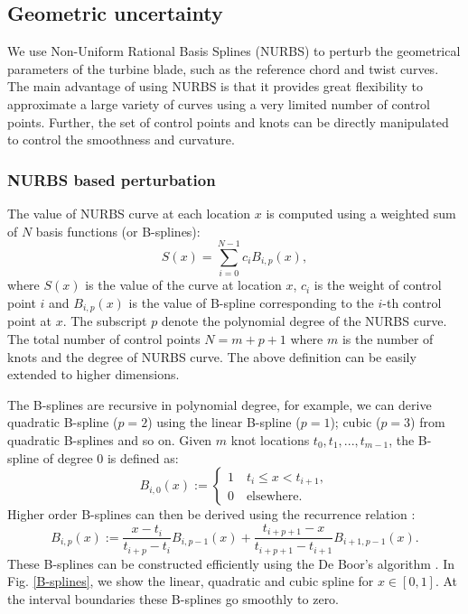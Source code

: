 \documentclass[review]{elsarticle}
\numberwithin{equation}{section}
\numberwithin{equation}{section}
\begin{document}
\subsection{Geometric uncertainty}
We use Non-Uniform Rational Basis Splines (NURBS) \cite{nurbs_book} to perturb the geometrical parameters of the turbine blade, such as the reference chord and twist curves. The main advantage of using NURBS is that it provides great flexibility to approximate a large variety of curves using a very limited number of control points. Further, the set of control points and knots can be directly manipulated to control the smoothness and curvature.

\subsubsection{NURBS based perturbation}
The value of NURBS curve at each location $x$ is computed using a weighted sum of $N$ basis functions (or B-splines):
\begin{equation}\label{NURB_curve}
S(x)  = \sum_{i=0}^{N-1} c_iB_{i,p}(x),
\end{equation}
where $S(x)$ is the value of the curve at location $x$, $c_i$ is the weight of control point $i$ and $B_{i,p}(x)$ is the value of B-spline corresponding to  the $i$-th control point at $x$. The subscript $p$ denote the polynomial degree of the NURBS curve. The total number of control points $N= m+p+1$ where $m$ is the number of knots  and the degree of NURBS curve. The above definition can be easily extended to higher dimensions. 

The B-splines are recursive in polynomial degree, for example, we can derive quadratic B-spline ($p=2$) using the linear B-spline ($p=1$); cubic ($p=3$) from quadratic B-splines and so on. Given $m$ knot locations $t_0,t_1,...,t_{m-1}$, the B-spline of degree 0 is defined as:
\begin{equation}\label{linearBspline}
B_{i,0}(x) :=
\begin{cases}
1\quad t_i\leq x < t_{i+1},\\
0\quad\text{elsewhere.}
\end{cases} 
\end{equation}
Higher order B-splines can then be derived using the recurrence relation \cite{deBoor}:
\begin{equation}\label{NURBS_recurrence}
B_{i,p}(x) := \frac{x-t_i}{t_{i+p} - t_i}B_{i,p-1}(x) + \frac{t_{i+p+1}  -  x}{t_{i+p+1}  -  t_{i+1}}B_{i+1,p-1}(x).
\end{equation}
These B-splines can be constructed efficiently using the De Boor's algorithm \cite{deBoor}. In Fig. \ref{B-splines}, we show the linear, quadratic and cubic spline for $x\in[0,1]$. At the interval boundaries these B-splines go smoothly to zero. 
\end{document}
